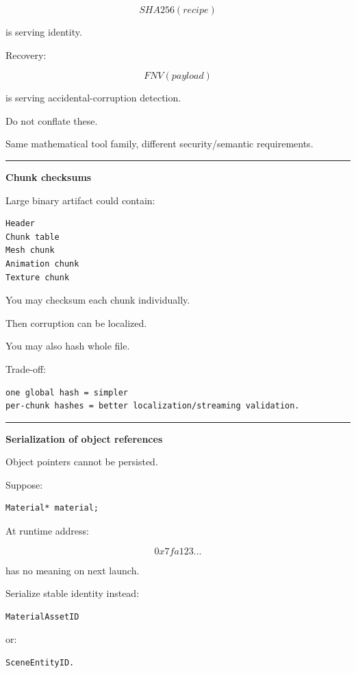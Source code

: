 \[
SHA256(recipe)
\]

is serving identity.

Recovery:

\[
FNV(payload)
\]

is serving accidental-corruption detection.

Do not conflate these.

Same mathematical tool family, different security/semantic requirements.

\begin{center}\rule{0.5\linewidth}{0.5pt}\end{center}

\textbf{Chunk checksums}

Large binary artifact could contain:

\begin{verbatim}
Header
Chunk table
Mesh chunk
Animation chunk
Texture chunk
\end{verbatim}

You may checksum each chunk individually.

Then corruption can be localized.

You may also hash whole file.

Trade-off:

\begin{verbatim}
one global hash = simpler
per-chunk hashes = better localization/streaming validation.
\end{verbatim}

\begin{center}\rule{0.5\linewidth}{0.5pt}\end{center}

\textbf{Serialization of object references}

Object pointers cannot be persisted.

Suppose:

\begin{verbatim}
Material* material;
\end{verbatim}

At runtime address:

\[
0x7fa123...
\]

has no meaning on next launch.

Serialize stable identity instead:

\begin{verbatim}
MaterialAssetID
\end{verbatim}

or:

\begin{verbatim}
SceneEntityID.
\end{verbatim}

